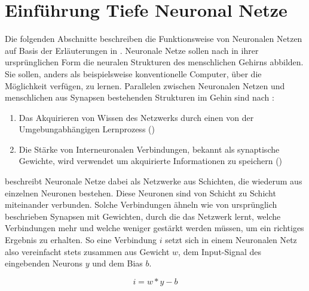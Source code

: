 \chapter{Einführung Tiefe Neuronal Netze}
\label{chap:dnn}

Die folgenden Abschnitte beschreiben die Funktionsweise von Neuronalen Netzen auf Basis der Erläuterungen in \cite{haykin2007neural}. Neuronale Netze sollen nach \cite{haykin2007neural} in ihrer ursprünglichen Form die neuralen Strukturen des menschlichen Gehirns abbilden. Sie sollen, anders als beispielsweise konventionelle Computer, über die Möglichkeit verfügen, zu lernen. Parallelen zwischen Neuronalen Netzen und menschlichen aus Synapsen bestehenden Strukturen im Gehin sind nach \cite{haykin2007neural}:

\begin{enumerate}
    \item \glqq Das Akquirieren von Wissen des Netzwerks durch einen von der Umgebung\linebreak abhängigen Lernprozess\grqq{} (\cite{haykin2007neural})
    \item \glqq Die Stärke von Interneuronalen Verbindungen, bekannt als synaptische Gewichte, wird verwendet um akquirierte Informationen zu speichern\grqq{} (\cite{haykin2007neural})
\end{enumerate}

\cite{haykin2007neural} beschreibt Neuronale Netze dabei als Netzwerke aus Schichten, die wiederum aus einzelnen Neuronen bestehen. Diese Neuronen sind von Schicht zu Schicht miteinander verbunden. Solche Verbindungen ähneln wie von \cite{haykin2007neural} ursprünglich beschrieben Synapsen mit Gewichten, durch die das Netzwerk lernt, welche Verbindungen mehr und welche weniger \glqq gestärkt \grqq{} werden müssen, um ein richtiges Ergebnis zu erhalten. So eine Verbindung $i$ setzt sich in einem Neuronalen Netz also vereinfacht stets zusammen aus Gewicht $w$, dem Input-Signal des eingebenden Neurons $y$ und dem Bias $b$.

$$i=w*y-b$$

